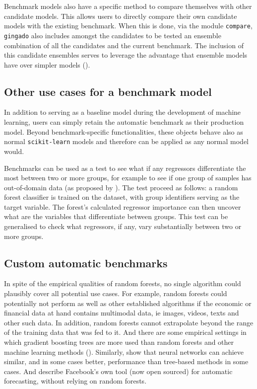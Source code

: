 \documentclass{article}
\begin{document}
Benchmark models also have a specific method to compare themselves with other candidate models. This allows users to directly compare their own candidate models with the existing benchmark. When this is done, via the module \texttt{compare}, \texttt{gingado} also includes amongst the candidates to be tested an ensemble combination of all the candidates and the current benchmark. The inclusion of this candidate ensembles serves to leverage the advantage that ensemble models have over simpler models (\cite{giannone2021illusion}).

\subsection{Other use cases for a benchmark model}

In addition to serving as a baseline model during the development of machine learning, users can simply retain the automatic benchmark as their production model. Beyond benchmark-specific functionalities, these objects behave also as normal \texttt{scikit-learn} models and therefore can be applied as any normal model would. 

Benchmarks can be used as a test to see what if any regressors differentiate the most between two or more groups, for example to see if one group of samples has out-of-domain data (as proposed by \cite{howard2020deep}). The test proceed as follows: a random forest classifier is trained on the dataset, with group identifiers serving as the target variable. The forest's calculated regressor importance can then uncover what are the variables that differentiate between groups. This test can be generalised to check what regressors, if any, vary substantially between two or more groups. 

\subsection{Custom automatic benchmarks}
In spite of the empirical qualities of random forests, no single algorithm could plausibly cover all potential use cases. For example, random forests could potentially not perform as well as other established algorithms if the economic or financial data at hand contains multimodal data, ie images, videos, texts and other such data. In addition, random forests cannot extrapolate beyond the range of the training data that was fed to it. And there are some empirical settings in which gradient boosting trees are more used than random forests and other machine learning methods (\cite{jrfm15040165}). Similarly, \cite{TabularDeepLearning} show that neural networks can achieve similar, and in some cases better, performance than tree-based methods in some cases. And \cite{taylor2018forecasting} describe Facebook's own tool (now open sourced) for automatic forecasting, without relying on random forests.
\end{document}
